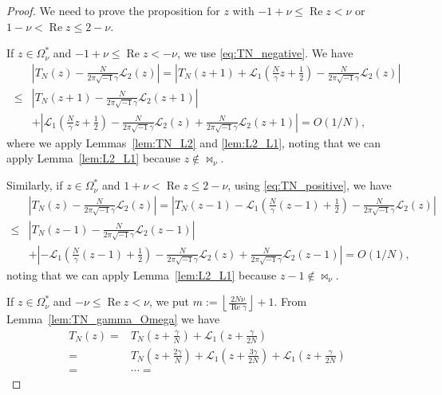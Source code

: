 \documentclass[a4paper,dvipdfmx]{amsart}
\theoremstyle{plain}
\theoremstyle{definition}
\theoremstyle{remark}
\renewcommand{\L}{\mathcal{L}}
\renewcommand{\Re}{\operatorname{Re}}
\renewcommand{\i}{\sqrt{-1}}
\numberwithin{equation}{section}
\begin{document}
\begin{proof}
We need to prove the proposition for $z$ with $-1+\nu\le\Re{z}<\nu$ or $1-\nu<\Re{z}\le2-\nu$.
\par
If $z\in\Omega^{\ast}_{\nu}$ and $-1+\nu\le\Re{z}<-\nu$, we use \eqref{eq:TN_negative}.
We have
\begin{align*}
  &\left|
    T_{N}(z)-\frac{N}{2\pi\i\gamma}\L_2(z)
  \right|
  =
  \left|
    T_{N}(z+1)
    +
    \L_1\left(\frac{N}{\gamma}z+\frac{1}{2}\right)
    -
    \frac{N}{2\pi\i\gamma}\L_2(z)
  \right|
  \\
  \le&
  \left|
    T_{N}(z+1)-\frac{N}{2\pi\i\gamma}\L_2(z+1)
  \right|
  \\
  &+
  \left|
    \L_1\left(\frac{N}{\gamma}z+\frac{1}{2}\right)
    -
    \frac{N}{2\pi\i\gamma}\L_2(z)
    +
    \frac{N}{2\pi\i\gamma}\L_2(z+1)
  \right|
  =
  O(1/N),
\end{align*}
where we apply Lemmas~\ref{lem:TN_L2} and \ref{lem:L2_L1}, noting that we can apply Lemma~\ref{lem:L2_L1} because $z\notin\bowtie_{\nu}$.
\par
Similarly, if $z\in\Omega^{\ast}_{\nu}$ and $1+\nu<\Re{z}\le2-\nu$, using \eqref{eq:TN_positive}, we have
\begin{align*}
  &\left|
    T_{N}(z)-\frac{N}{2\pi\i\gamma}\L_2(z)
  \right|
  =
  \left|
    T_{N}(z-1)
    -
    \L_1\left(\frac{N}{\gamma}(z-1)+\frac{1}{2}\right)
    -
    \frac{N}{2\pi\i\gamma}\L_2(z)
  \right|
  \\
  \le&
  \left|
    T_{N}(z-1)-\frac{N}{2\pi\i\gamma}\L_2(z-1)
  \right|
  \\
  &+
  \left|
    -\L_1\left(\frac{N}{\gamma}(z-1)+\frac{1}{2}\right)
    -
    \frac{N}{2\pi\i\gamma}\L_2(z)
    +
    \frac{N}{2\pi\i\gamma}\L_2(z-1)
  \right|
  =
  O(1/N),
\end{align*}
noting that we can apply Lemma~\ref{lem:L2_L1} because $z-1\notin\bowtie_{\nu}$.
\par
If $z\in\Omega^{\ast}_{\nu}$ and $-\nu\le\Re{z}<\nu$, we put $m:=\left\lfloor\frac{2N\nu}{\Re\gamma}\right\rfloor+1$.
From Lemma~\ref{lem:TN_gamma_Omega} we have
\begin{equation*}
\begin{split}
  T_{N}(z)
  =&
  T_{N}\left(z+\frac{\gamma}{N}\right)
  +
  \L_1\left(z+\frac{\gamma}{2N}\right)
  \\
  =&
  T_{N}\left(z+\frac{2\gamma}{N}\right)
  +
  \L_1\left(z+\frac{3\gamma}{2N}\right)
  +
  \L_1\left(z+\frac{\gamma}{2N}\right)
  \\
  =&\cdots
  =

\end{split}
\end{equation*}
\end{proof}
\end{document}
